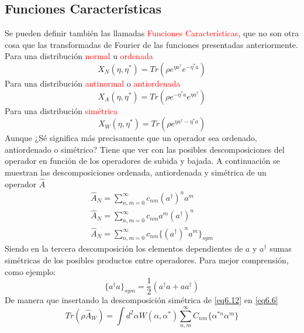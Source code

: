 \documentclass{book}
\begin{document}
\subsection{Funciones Características}
Se pueden definir también las llamadas \textcolor{red}{Funciones Características}, que no son otra cosa que las transformadas de Fourier de las funciones presentadas anteriormente. \\
Para una distribución \textcolor{red}{normal} u \textcolor{red}{ordenada}
\begin{equation}\label{eq6.9}X_N(\eta,\eta^*)=Tr(\rho e^{\eta a^\dag}e^{-\eta^* a})\end{equation}
Para una distribución \textcolor{red}{antinormal} o \textcolor{red}{antiordenada}
\begin{equation}\label{eq6.10}X_A(\eta,\eta^*)=Tr(\rho e^{-\eta^* a}e^{\eta a^\dag})\end{equation}
Para una distribución \textcolor{red}{simétrica}
\begin{equation}\label{eq6.11}X_W(\eta,\eta^*)=Tr(\rho e^{\eta a^\dag-\eta^* a})\end{equation}
Aunque ¿Sé significa más precisamente que un operador sea ordenado, antiordenado o simétrico? Tiene que ver con las posibles descomposiciones del operador en función de los operadores de subida y bajada. A continuación se muestran las descomposiciones ordenada, antiordenada y simétrica de un operador $\hat{A}$
\begin{equation}\label{eq6.12}\begin{aligned} \hat{A}_N=\sum_{n,m=0}^\infty c_{nm} (a^\dag)^n a^m \\ \hat{A}_N=\sum_{n,m=0}^\infty  c_{nm} a^m (a^{\dag})^n \\ \hat{A}_N=\sum_{n,m=0}^\infty  c_{nm} \{(a^\dag)^n a^m \}_{sym}\end{aligned}\end{equation}
Siendo en la tercera descomposición los elementos dependientes de $a$  y $a^\dag$ sumas simétricas de los posibles productos entre operadores. Para mejor comprensión, como ejemplo:
\begin{equation}\label{eq6.13}\{a^\dag a\}_{sym}=\frac{1}{2}(a^\dag a+aa^\dag)\end{equation}
De manera que insertando la descomposición simétrica de \ref{eq6.12} en \ref{eq6.6}
\begin{equation}\label{eq6.14}Tr(\rho\hat{A}_W)=\int d^2\alpha W(\alpha,\alpha^*)\sum_{n,m}^\infty C_{nm}\{\alpha^{*n}\alpha^m\}\end{equation}
\end{document}
